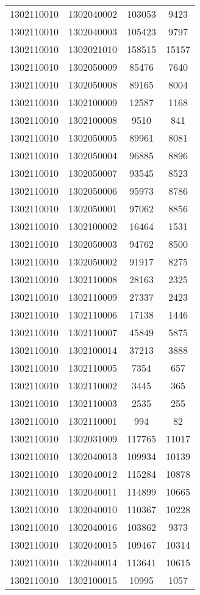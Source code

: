 \begin{longtable}{llcc}
1302110010 & 1302040002 & 103053 & 9423\\
1302110010 & 1302040003 & 105423 & 9797\\
1302110010 & 1302021010 & 158515 & 15157\\
1302110010 & 1302050009 & 85476 & 7640\\
1302110010 & 1302050008 & 89165 & 8004\\
1302110010 & 1302100009 & 12587 & 1168\\
1302110010 & 1302100008 & 9510 & 841\\
1302110010 & 1302050005 & 89961 & 8081\\
1302110010 & 1302050004 & 96885 & 8896\\
1302110010 & 1302050007 & 93545 & 8523\\
1302110010 & 1302050006 & 95973 & 8786\\
1302110010 & 1302050001 & 97062 & 8856\\
1302110010 & 1302100002 & 16464 & 1531\\
1302110010 & 1302050003 & 94762 & 8500\\
1302110010 & 1302050002 & 91917 & 8275\\
1302110010 & 1302110008 & 28163 & 2325\\
1302110010 & 1302110009 & 27337 & 2423\\
1302110010 & 1302110006 & 17138 & 1446\\
1302110010 & 1302110007 & 45849 & 5875\\
1302110010 & 1302100014 & 37213 & 3888\\
1302110010 & 1302110005 & 7354 & 657\\
1302110010 & 1302110002 & 3445 & 365\\
1302110010 & 1302110003 & 2535 & 255\\
1302110010 & 1302110001 & 994 & 82\\
1302110010 & 1302031009 & 117765 & 11017\\
1302110010 & 1302040013 & 109934 & 10139\\
1302110010 & 1302040012 & 115284 & 10878\\
1302110010 & 1302040011 & 114899 & 10665\\
1302110010 & 1302040010 & 110367 & 10228\\
1302110010 & 1302040016 & 103862 & 9373\\
1302110010 & 1302040015 & 109467 & 10314\\
1302110010 & 1302040014 & 113641 & 10615\\
1302110010 & 1302100015 & 10995 & 1057\\

\end{longtable}
